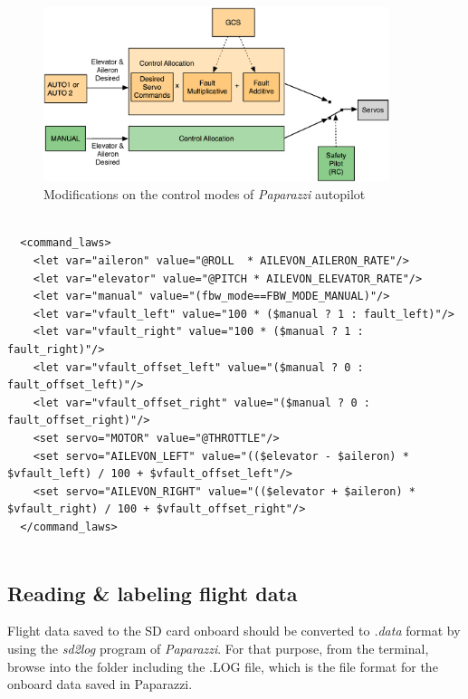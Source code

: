 \begin{figure}
\begin{center}
\includegraphics[width=0.9\textwidth]{figures/faultInjectionPprz}    %
\caption{Modifications on the control modes of \emph{Paparazzi} autopilot} 
\label{fig:faultInjectionPaparazzi}
\end{center}
\end{figure}


\lstset{language=C}
\begin{lstlisting}

  <command_laws>
    <let var="aileron" value="@ROLL  * AILEVON_AILERON_RATE"/>
    <let var="elevator" value="@PITCH * AILEVON_ELEVATOR_RATE"/>
    <let var="manual" value="(fbw_mode==FBW_MODE_MANUAL)"/>
    <let var="vfault_left" value="100 * ($manual ? 1 : fault_left)"/>
    <let var="vfault_right" value="100 * ($manual ? 1 : fault_right)"/>
    <let var="vfault_offset_left" value="($manual ? 0 : fault_offset_left)"/>
    <let var="vfault_offset_right" value="($manual ? 0 : fault_offset_right)"/>
    <set servo="MOTOR" value="@THROTTLE"/>
    <set servo="AILEVON_LEFT" value="(($elevator - $aileron) * $vfault_left) / 100 + $vfault_offset_left"/>
    <set servo="AILEVON_RIGHT" value="(($elevator + $aileron) * $vfault_right) / 100 + $vfault_offset_right"/>
  </command_laws>
  
\end{lstlisting}


\subsection{Reading \& labeling flight data}


Flight data saved to the SD card onboard should be converted to \emph{.data} format by using the \textit{sd2log} program of \emph{Paparazzi}. For that purpose, from the terminal, browse into the folder including  the .LOG file, which is the file format for the onboard data saved in Paparazzi. 

